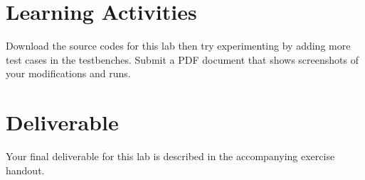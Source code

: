 \documentclass[a4paper, 11pt,oneside]{article}
\begin{document}
\section{Learning Activities}
Download the source codes for this lab then try experimenting by adding more test cases in the testbenches. Submit a PDF document that shows screenshots of your modifications and runs.

\section{Deliverable}
Your final deliverable for this lab is described in the accompanying exercise handout.




\nocite{*}
\end{document}
